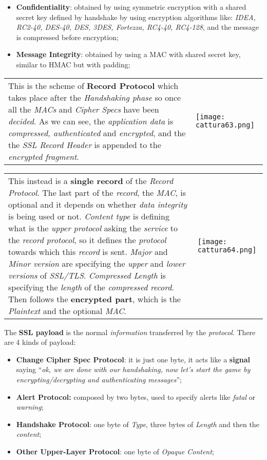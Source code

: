 \documentclass{article}
\begin{document}
\begin{itemize} 
\item \textbf{Confidentiality}: obtained by using symmetric encryption with a shared secret key defined by handshake by using encryption algorithms like:  \emph{IDEA, RC2-40, DES-40, DES, 3DES, Fortezza, RC4-40, RC4-128}, and the message is compressed before encryption;
\item \textbf{Message Integrity}: obtained by using a MAC with shared secret key, similar to HMAC but with padding;
\end{itemize}
\begin{tabular}{C{9.5cm}  L{10.5cm}}
This is the scheme of \textbf{Record Protocol} which takes place after the \emph{Handshaking phase} so once all the \emph{MACs} and \emph{Cipher Specs} have been \emph{decided}. As we can see, the \emph{application data} is \emph{compressed, authenticated} and \emph{encrypted}, and the the \emph{SSL Record Header} is appended to the \emph{encrypted fragment}. 
& \texttt{[image: cattura63.png]}
\end{tabular}
\begin{tabular}{C{9.5cm}  L{10.5cm}}
This instead is a \textbf{single record} of the \emph{Record Protocol}. The last part of the \emph{record}, the \emph{MAC}, is optional and it depends on whether \emph{data integrity} is being used or not. \emph{Content type} is defining what is the \emph{upper protocol} asking the \emph{service} to the \emph{record protocol}, so it defines the \emph{protocol} towards which this \emph{record} is sent. \emph{Major} and \emph{Minor version} are specifying the \emph{upper} and \emph{lower versions} of \emph{SSL/TLS}. \emph{Compressed Length} is specifying the \emph{length} of the \emph{compressed record}. Then follows the \textbf{encrypted part}, which is the \emph{Plaintext} and the optional \emph{MAC}. 
& \texttt{[image: cattura64.png]}
\end{tabular}
The \textbf{SSL payload} is the normal \emph{information} transferred by the \emph{protocol}. There are 4 kinds of payload:
\begin{itemize}
\item \textbf{Change Cipher Spec Protocol}: it is just one byte, it acts like a \textbf{signal} saying “\emph{ok, we are done with our handshaking, now let’s start the game by encrypting/decrypting and authenticating messages}”;
\item \textbf{Alert Protocol: }composed by two bytes, used to specify alerts like \emph{fatal} or \emph{warning};
\item \textbf{Handshake Protocol}: one byte of \emph{Type}, three bytes of \emph{Length} and then the \emph{content};
\item \textbf{Other Upper-Layer Protocol}: one byte of \emph{Opaque Content};
\end{itemize}
\end{document}
